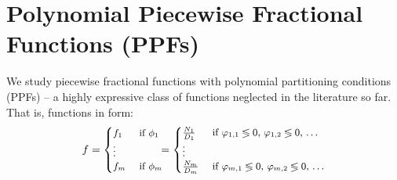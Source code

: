 \documentclass{article}
\newcommand{\case}[2]{#2 &\text{ if } #1}%
\begin{document}


\section{Polynomial Piecewise Fractional Functions (PPFs)}
\label{sect:ppfs}
We study piecewise fractional functions with polynomial partitioning conditions (PPFs) -- a highly expressive class of functions neglected in the literature so far.
That is, functions in form:
\begin{equation}\footnotesize
\label{e:ppf}
f = 
  \begin{cases}
  \case{\phi_1}{f_1}\\
\vdots\\
  \case{\phi_m}{f_m}    
  \end{cases}
\!\!\!=
  \begin{cases}
  \case{\varphi_{1,1} \lessgtr 0,\, \varphi_{1,2} \lessgtr 0,\, \ldots}{\frac{N_1}{D_1}} \\
\vdots\\
   \case{\varphi_{m,1} \lessgtr 0,\, \varphi_{m,2} \lessgtr 0,\, \ldots}{\frac{N_m}{D_m}}    
  \end{cases}
\end{equation}
\end{document}
